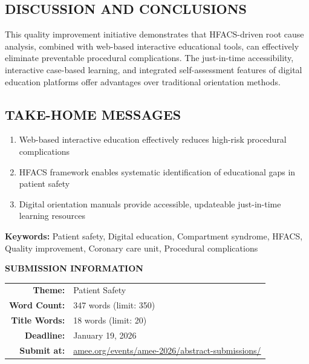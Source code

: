 \documentclass[11pt,a4paper]{article}
\begin{document}
\subsection*{DISCUSSION AND CONCLUSIONS}
This quality improvement initiative demonstrates that HFACS-driven root cause analysis, combined with web-based interactive educational tools, can effectively eliminate preventable procedural complications. The just-in-time accessibility, interactive case-based learning, and integrated self-assessment features of digital education platforms offer advantages over traditional orientation methods.

\subsection*{TAKE-HOME MESSAGES}
\begin{enumerate}[leftmargin=2em, itemsep=0.3em]
    \item Web-based interactive education effectively reduces high-risk procedural complications
    \item HFACS framework enables systematic identification of educational gaps in patient safety
    \item Digital orientation manuals provide accessible, updateable just-in-time learning resources
\end{enumerate}

\vspace{1.5em}

\noindent\textbf{\color{navyblue}Keywords:} Patient safety, Digital education, Compartment syndrome, HFACS, Quality improvement, Coronary care unit, Procedural complications

\vspace{2em}

\begin{center}
\colorbox{lightblue!10}{%
    \parbox{0.9\textwidth}{%
        \centering
        \vspace{0.8em}
        {\bfseries\color{navyblue}SUBMISSION INFORMATION}\\[0.5em]
        \begin{tabular}{rl}
            \textbf{Theme:} & Patient Safety \\
            \textbf{Word Count:} & 347 words (limit: 350) \\
            \textbf{Title Words:} & 18 words (limit: 20) \\
            \textbf{Deadline:} & January 19, 2026 \\
            \textbf{Submit at:} & \href{https://amee.org/events/amee-2026/abstract-submissions/}{amee.org/events/amee-2026/abstract-submissions/}
        \end{tabular}
        \vspace{0.8em}
    }%
}
\end{center}
\end{document}
